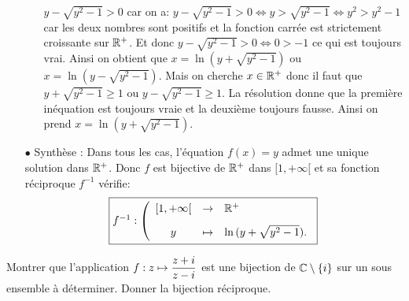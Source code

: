 \documentclass[a4paper, 11pt,reqno]{article}
\begin{document}
\begin{correction}
\begin{itemize}
\begin{itemize}
					$y-\sqrt{y^2-1}>0$ car on a: $y-\sqrt{y^2-1}>0\Leftrightarrow y>\sqrt{y^2-1}\Leftrightarrow y^2>y^2-1$ car les deux nombres sont positifs et la fonction carr\'ee est strictement croissante sur $\mathbb{R}^+$. Et donc $y-\sqrt{y^2-1}>0 \Leftrightarrow 0>-1$ ce qui est toujours vrai. Ainsi on obtient que $x=\ln{(y+\sqrt{y^2-1})}$ ou $x=\ln{(y-\sqrt{y^2-1})}$. Mais on cherche $x\in\mathbb{R}^+$ donc il faut que $y+\sqrt{y^2-1}\geq 1$ ou $y-\sqrt{y^2-1}\geq 1$. La r\'esolution donne que la premi\`{e}re in\'equation est toujours vraie et la deuxi\`{e}me toujours fausse. Ainsi on prend $x=\ln{(y+\sqrt{y^2-1})}$.
			\end{itemize}
		\item[$\bullet$] Synth\`ese : Dans tous les cas, l'\'equation $f(x)=y$ admet une unique solution dans $\mathbb{R}^+$. Donc   $f$ est bijective de $\mathbb{R}^{+}$ dans $\lbrack 1,+\infty\lbrack$ et sa fonction r\'eciproque $f^{-1}$ v\'erifie:
			$$\fbox{$f^{-1}: \left( \begin{array}{cll}
							\lbrack 1,+\infty\lbrack & \rightarrow & \R^+ \vsec             \\
							y                        & \mapsto     & \ln{(y+\sqrt{y^2-1})}.
						\end{array}\right.$}$$
	\end{itemize}
\end{correction}
\begin{exercice}  \;
	Montrer que l'application $f: z\mapsto \displaystyle\frac{z+i}{z-i}$ est une bijection de $\mathbb{C}\setminus \lbrace i \rbrace$ sur un sous ensemble \`{a} d\'eterminer. Donner la bijection r\'eciproque.
\end{exercice}
\end{document}
